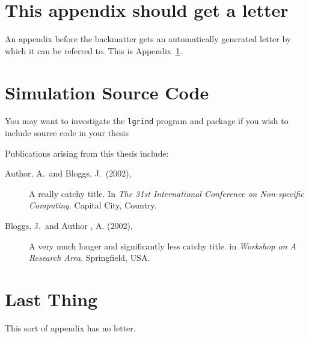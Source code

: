 \documentclass[a4paper,11pt,bcshonoursthesis,singlespace,twoside]{cssethesis}
\begin{document}
\chapter{This appendix should get a letter}
\label{app:example}
An appendix before the backmatter gets an automatically generated letter by
which it can be referred to. This is Appendix~\ref{app:example}.

\chapter{Simulation Source Code}
You may want to investigate the \texttt{lgrind} program and package if you
wish to include source code in your thesis


\backmatter						%
\begin{thesisauthorvita}
\begin{spacing}{1}
Publications arising from this thesis include:
\begin{description}
\item[Author, A.\ and Bloggs, J.\ (2002),]
A really catchy title. In \emph{The 31st International Conference
on Non-specific Computing.} Capital City, Country.
\item[Bloggs, J.\ and Author , A. (2002),]
A very much longer and significantly less catchy title. in \emph {Workshop on
A Research Area}. Springfield, USA.
\end{description}
\end{spacing}
\end{thesisauthorvita}


\chapter{Last Thing} %
This sort of appendix has no letter. 
\end{document}
